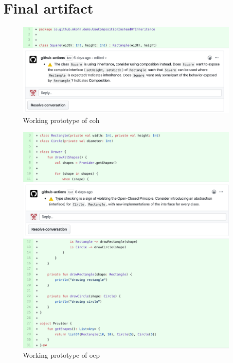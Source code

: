\clearpage
\section{Final artifact}
\label{final-artifact}
\begin{figure}[h!]
    \centering
    \includegraphics[width=\textwidth]{images/final_coh.png}
    \caption{Working prototype of \gls{coh}}
\end{figure}

\begin{figure}[h!]
    \centering
    \includegraphics[width=\textwidth]{images/final_ocp.png}
    \caption{Working prototype of \gls{ocp}}
\end{figure}

